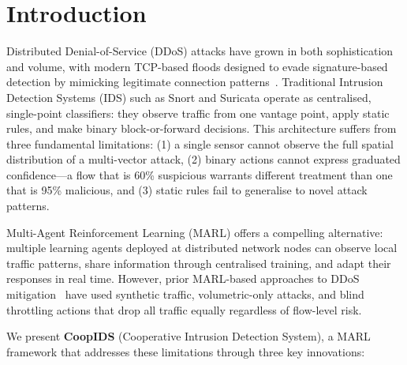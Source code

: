 \documentclass[sigconf,nonacm]{acmart}
\begin{document}


\maketitle

\section{Introduction}
\label{sec:intro}

Distributed Denial-of-Service (DDoS) attacks have grown in both sophistication and volume, with modern TCP-based floods designed to evade signature-based detection by mimicking legitimate connection patterns~\cite{mirkovic2004taxonomy}. Traditional Intrusion Detection Systems (IDS) such as Snort and Suricata operate as centralised, single-point classifiers: they observe traffic from one vantage point, apply static rules, and make binary block-or-forward decisions. This architecture suffers from three fundamental limitations: (1) a single sensor cannot observe the full spatial distribution of a multi-vector attack, (2) binary actions cannot express graduated confidence---a flow that is 60\% suspicious warrants different treatment than one that is 95\% malicious, and (3) static rules fail to generalise to novel attack patterns.

Multi-Agent Reinforcement Learning (MARL) offers a compelling alternative: multiple learning agents deployed at distributed network nodes can observe local traffic patterns, share information through centralised training, and adapt their responses in real time. However, prior MARL-based approaches to DDoS mitigation~\cite{malialis2015distributed} have used synthetic traffic, volumetric-only attacks, and blind throttling actions that drop all traffic equally regardless of flow-level risk.

We present \textbf{CoopIDS} (Cooperative Intrusion Detection System), a MARL framework that addresses these limitations through three key innovations:
\end{document}
